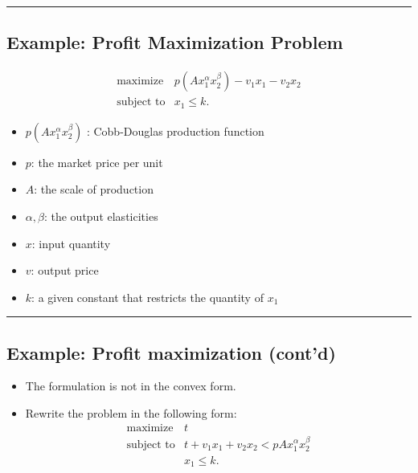 \documentclass[]{article}
\providecommand{\tightlist}{%
  \setlength{\itemsep}{0pt}\setlength{\parskip}{0pt}}
\begin{document}
\begin{center}\rule{0.5\linewidth}{\linethickness}\end{center}

\hypertarget{example-profit-maximization-problem}{%
\subsection{Example: Profit Maximization
Problem}\label{example-profit-maximization-problem}}

\[\begin{array}{ll}
   \text{maximize} & p(A x_1^\alpha x_2^\beta) - v_1 x_1 - v_2 x_2 \\
   \text{subject to}& x_1 \le k.
\end{array}\]

\begin{itemize}
\tightlist
\item
  \(p(A x_1^\alpha x_2^\beta)\) : Cobb-Douglas production function
\item
  \(p\): the market price per unit
\item
  \(A\): the scale of production
\item
  \(\alpha, \beta\): the output elasticities
\item
  \(x\): input quantity
\item
  \(v\): output price
\item
  \(k\): a given constant that restricts the quantity of \(x_1\)
\end{itemize}

\begin{center}\rule{0.5\linewidth}{\linethickness}\end{center}

\hypertarget{example-profit-maximization-contd}{%
\subsection{Example: Profit maximization
(cont'd)}\label{example-profit-maximization-contd}}

\begin{itemize}
\tightlist
\item
  The formulation is not in the convex form.
\item
  Rewrite the problem in the following form: \[\begin{array}{ll}
    \text{maximize} & t \\
    \text{subject to} & t  + v_1 x_1  + v_2 x_2 < p A x_1^{\alpha} x_2^{\beta}\\
                  & x_1 \le k.
    \end{array}\]
\end{itemize}
\end{document}

